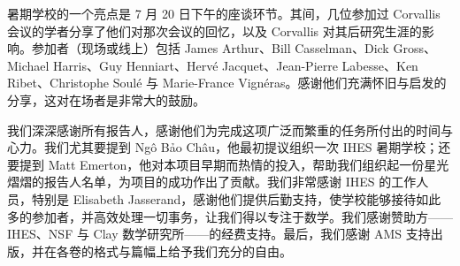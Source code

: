 暑期学校的一个亮点是 7 月 20 日下午的座谈环节。其间，几位参加过 Corvallis 会议的学者分享了他们对那次会议的回忆，以及 Corvallis 对其后研究生涯的影响。参加者（现场或线上）包括 James Arthur、Bill Casselman、Dick Gross、Michael Harris、Guy Henniart、Hervé Jacquet、Jean-Pierre Labesse、Ken Ribet、Christophe Soulé 与 Marie-France Vignéras。感谢他们充满怀旧与启发的分享，这对在场者是非常大的鼓励。

我们深深感谢所有报告人，感谢他们为完成这项广泛而繁重的任务所付出的时间与心力。我们尤其要提到 Ngô Bảo Châu，他最初提议组织一次 IHES 暑期学校；还要提到 Matt Emerton，他对本项目早期而热情的投入，帮助我们组织起一份星光熠熠的报告人名单，为项目的成功作出了贡献。我们非常感谢 IHES 的工作人员，特别是 Elisabeth Jasserand，感谢他们提供后勤支持，使学校能够接待如此多的参加者，并高效处理一切事务，让我们得以专注于数学。我们感谢赞助方——IHES、NSF 与 Clay 数学研究所——的经费支持。最后，我们感谢 AMS 支持出版，并在各卷的格式与篇幅上给予我们充分的自由。

